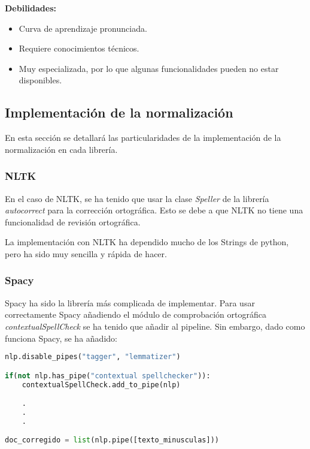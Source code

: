 \documentclass[a4paper,twocolumn]{article}
\begin{document}
    \textbf{Debilidades:}
    \begin{itemize}
        \item Curva de aprendizaje pronunciada.
        \item Requiere conocimientos técnicos.
        \item Muy especializada, por lo que algunas funcionalidades pueden no estar disponibles.
    \end {itemize}

    \subsection{Implementación de la normalización}\label{subsec:implementacion-de-la-normalizacion}
    En esta sección se detallará las particularidades de la implementación \cite{marcelo.implementaciones} de la normalización en cada librería.

    \subsubsection{NLTK}\label{subsubsec:nltk_impl}
    En el caso de NLTK, se ha tenido que usar la clase \textit{Speller} de la librería \textit{autocorrect} para la corrección ortográfica.
    Esto se debe a que NLTK no tiene una funcionalidad de revisión ortográfica.

    La implementación con NLTK ha dependido mucho de los Strings de python, pero ha sido muy sencilla y rápida de hacer.

    \subsubsection{Spacy}\label{subsubsec:spacy_impl}
    Spacy ha sido la librería más complicada de implementar.
    Para usar correctamente Spacy añadiendo el módulo de comprobación ortográfica \textit{contextualSpellCheck} se ha tenido que añadir al pipeline.
    Sin embargo, dado como funciona Spacy, se ha añadido:
    \begin{lstlisting}[language=Python,label={lst:codigoSpellSpacy},basicstyle=\scriptsize]
nlp.disable_pipes("tagger", "lemmatizer")

if(not nlp.has_pipe("contextual spellchecker")):
    contextualSpellCheck.add_to_pipe(nlp)

    .
    .
    .

doc_corregido = list(nlp.pipe([texto_minusculas]))
    \end{lstlisting}
\end{document}
